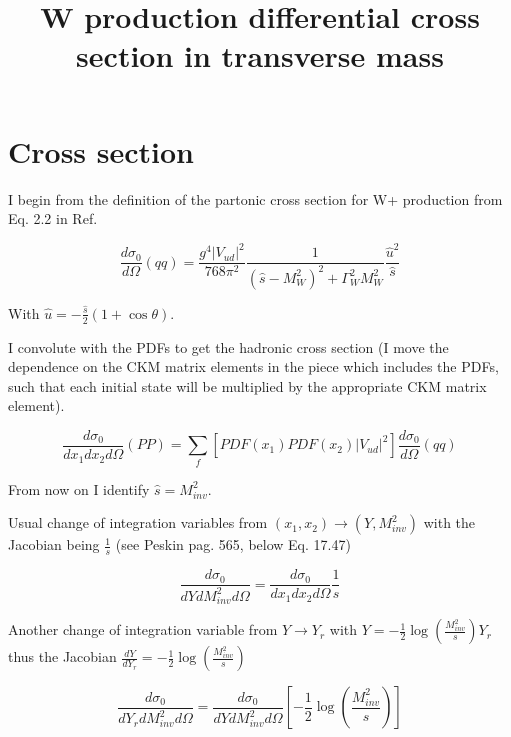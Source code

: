 \documentclass{article}
\begin{document}
\title{W production differential cross section in transverse mass}
\author{}
\date{}
\maketitle

\section{Cross section}

I begin from the definition of the partonic cross section for W+ production from Eq. 2.2 in Ref.~\cite{CarloniCalame:2006zq}

\begin{equation}
 \frac{d\sigma_0}{d\Omega} (qq) = \frac{g^4 |V_{ud}|^2}{768\pi^2}\frac{1}{(\hat{s} - M_W^2)^2 + \Gamma_W^2 M_W^2} \frac{\hat{u}^2}{\hat{s}}
\end{equation}

With $\hat{u} = -\frac{\hat{s}}{2}(1+\cos\theta)$.

I convolute with the PDFs to get the hadronic cross section (I move the dependence on the CKM matrix elements in the piece which includes the PDFs, such that each initial state will be multiplied by the appropriate CKM matrix element).

\begin{equation}
 \frac{d\sigma_0}{dx_1 dx_2 d\Omega} (PP) = \sum_f \left[PDF(x_1) PDF(x_2) |V_{ud}|^2 \right]\frac{d\sigma_0}{d\Omega} (qq)
\end{equation}

From now on I identify $\hat{s} = M_{inv}^2$.

Usual change of integration variables from $(x_1,x_2)\to(Y,M_{inv}^2)$ with the Jacobian being $\frac{1}{s}$
(see Peskin pag. 565, below Eq. 17.47)

\begin{equation}
 \frac{d\sigma_0}{dY dM_{inv}^2 d\Omega} = \frac{d\sigma_0}{dx_1 dx_2 d\Omega} \frac{1}{s}
\end{equation}

Another change of integration variable from $Y\to Y_r$ with $Y=-\frac{1}{2}\log\left(\frac{M_{inv}^2}{s}\right)Y_r$ thus the Jacobian
$\frac{dY}{dY_r}=-\frac{1}{2}\log\left(\frac{M_{inv}^2}{s}\right)$

\begin{equation}
 \frac{d\sigma_0}{dY_r dM_{inv}^2 d\Omega} = \frac{d\sigma_0}{dY dM_{inv}^2 d\Omega} \left[-\frac{1}{2}\log\left(\frac{M_{inv}^2}{s}\right)\right]
\end{equation}
\end{document}
